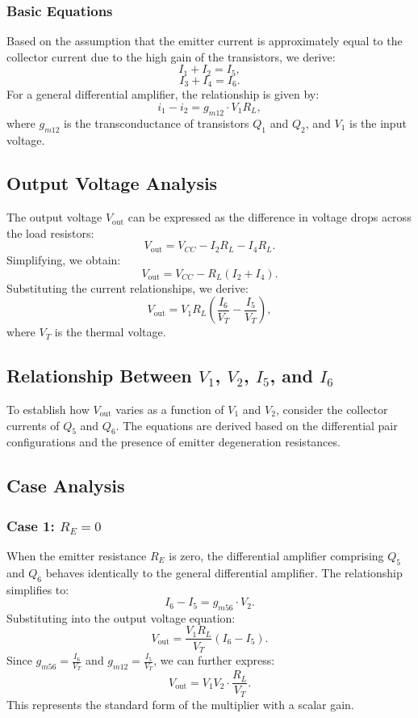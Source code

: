\documentclass[a4paper,9pt,twoside,openany,twocolumn]{memoir}
\begin{document}
\subsubsection{Basic Equations}
Based on the assumption that the emitter current is approximately equal to the collector current due to the high gain of the transistors, we derive:
\[
I_1 + I_2 = I_5,
\]
\[
I_3 + I_4 = I_6.
\]
For a general differential amplifier, the relationship is given by:
\[
i_1 - i_2 = g_{m12} \cdot V_1 R_L,
\]
where $g_{m12}$ is the transconductance of transistors $Q_1$ and $Q_2$, and $V_1$ is the input voltage.

\subsection{Output Voltage Analysis}
The output voltage $V_{\text{out}}$ can be expressed as the difference in voltage drops across the load resistors:
\[
V_{\text{out}} = V_{CC} - I_2 R_L - I_4 R_L.
\]
Simplifying, we obtain:
\[
V_{\text{out}} = V_{CC} - R_L (I_2 + I_4).
\]
Substituting the current relationships, we derive:
\[
V_{\text{out}} = V_1 R_L \left( \frac{I_6}{V_T} - \frac{I_5}{V_T} \right),
\]
where $V_T$ is the thermal voltage.

\subsection{Relationship Between $V_1$, $V_2$, $I_5$, and $I_6$}
To establish how $V_{\text{out}}$ varies as a function of $V_1$ and $V_2$, consider the collector currents of $Q_5$ and $Q_6$. The equations are derived based on the differential pair configurations and the presence of emitter degeneration resistances.

\subsection{Case Analysis}
\subsubsection{Case 1: $R_E = 0$}
When the emitter resistance $R_E$ is zero, the differential amplifier comprising $Q_5$ and $Q_6$ behaves identically to the general differential amplifier. The relationship simplifies to:
\[
I_6 - I_5 = g_{m56} \cdot V_2.
\]
Substituting into the output voltage equation:
\[
V_{\text{out}} = \frac{V_1 R_L}{V_T} (I_6 - I_5).
\]
Since $g_{m56} = \frac{I_6}{V_T}$ and $g_{m12} = \frac{I_5}{V_T}$, we can further express:
\[
V_{\text{out}} = V_1 V_2 \cdot \frac{R_L}{V_T}.
\]
This represents the standard form of the multiplier with a scalar gain.
\end{document}
